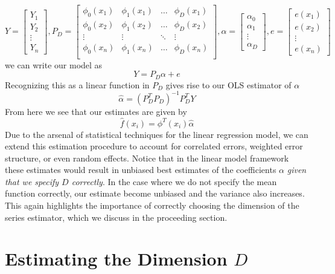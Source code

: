 \documentclass[12pt]{article}  %
\begin{document}
$$Y = \begin{bmatrix}Y_1\\ Y_2\\\vdots\\Y_n\end{bmatrix}, P_D = \begin{bmatrix}\phi_0(x_1) & \phi_1(x_1) & \ldots & \phi_{D}(x_1)\\\phi_0(x_2) & \phi_1(x_2) & \ldots & \phi_{D}(x_2)\\\vdots & \vdots & \ddots & \vdots \\\phi_0(x_n) & \phi_1(x_n) & \ldots & \phi_{D}(x_n)\\\end{bmatrix}, \alpha = \begin{bmatrix}\alpha_0\\\alpha_1 \\\vdots\\\alpha_D\end{bmatrix}, e =\begin{bmatrix}e(x_1)\\e(x_2)\\\vdots\\e(x_n)\end{bmatrix}$$ we can write our model as $$Y = P_D\alpha + e$$
Recognizing this as a linear function in $P_D$ gives rise to our OLS estimator of $\alpha$ $$\hat{\alpha} = (P_D^{T}P_D)^{-1}P_D^{T}Y$$ From here we see that our estimates are given by $$\hat{f}(x_i) = \phi^{T}(x_i)\hat{\alpha}$$
Due to the arsenal of statistical techniques for the linear regression model, we can extend this estimation procedure to account for correlated errors, weighted error structure, or even random effects. Notice that in the linear model framework these estimates would result in unbiased best estimates of the coefficients $\alpha$ \textit{given that we specify $D$ correctly}. In the case where we do not specify the mean function correctly, our estimate become unbiased and the variance also increases. This again highlights the importance of correctly choosing the dimension of the series estimator, which we discuss in the proceeding section. 
\section{Estimating the Dimension $D$}
\end{document}

